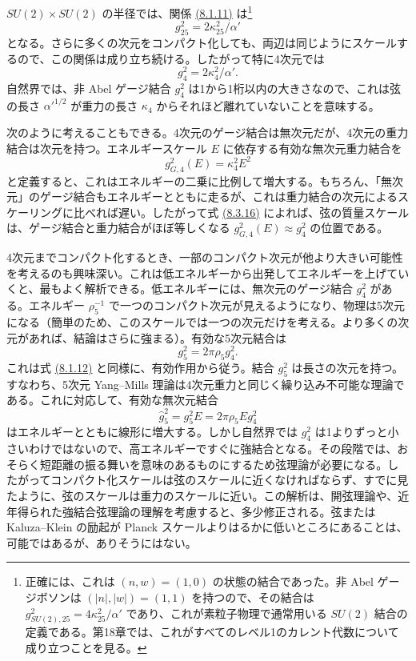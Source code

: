 $SU(2)\times SU(2)$ の半径では、関係 \hyperref[eq:8.1.11]{(8.1.11)} は\footnote[2]{正確には、これは $(n,w)=(1,0)$ の状態の結合であった。非 Abel ゲージボソンは $(|n|,|w|)=(1,1)$ を持つので、その結合は $g_{SU(2),25}^2=4\kappa_{25}^2/\alpha'$ であり、これが素粒子物理で通常用いる $SU(2)$ 結合の定義である。第18章では、これがすべてのレベル1のカレント代数について成り立つことを見る。}
\begin{equation}
g_{25}^2=2\kappa_{25}^2/\alpha'
\tag{8.3.15}\label{eq:8.3.15}
\end{equation}
となる。さらに多くの次元をコンパクト化しても、両辺は同じようにスケールするので、この関係は成り立ち続ける。したがって特に4次元では
\begin{equation}
g_4^2=2\kappa_4^2/\alpha'.
\tag{8.3.16}\label{eq:8.3.16}
\end{equation}
自然界では、非 Abel ゲージ結合 $g_4^2$ は1から1桁以内の大きさなので、これは弦の長さ $\alpha'^{1/2}$ が重力の長さ $\kappa_4$ からそれほど離れていないことを意味する。

次のように考えることもできる。4次元のゲージ結合は無次元だが、4次元の重力結合は次元を持つ。エネルギースケール $E$ に依存する有効な無次元重力結合を
\begin{equation}
g_{G,4}^2(E)=\kappa_4^2E^2
\tag{8.3.17}\label{eq:8.3.17}
\end{equation}
と定義すると、これはエネルギーの二乗に比例して増大する。もちろん、「無次元」のゲージ結合もエネルギーとともに走るが、これは重力結合の次元によるスケーリングに比べれば遅い。したがって式 \hyperref[eq:8.3.16]{(8.3.16)} によれば、弦の質量スケールは、ゲージ結合と重力結合がほぼ等しくなる $g_{G,4}^2(E)\approx g_4^2$ の位置である。

4次元までコンパクト化するとき、一部のコンパクト次元が他より大きい可能性を考えるのも興味深い。これは低エネルギーから出発してエネルギーを上げていくと、最もよく解析できる。低エネルギーには、無次元のゲージ結合 $g_4^2$ がある。エネルギー $\rho_5^{-1}$ で一つのコンパクト次元が見えるようになり、物理は5次元になる（簡単のため、このスケールでは一つの次元だけを考える。より多くの次元があれば、結論はさらに強まる）。有効な5次元結合は
\begin{equation}
g_5^2=2\pi\rho_5g_4^2.
\tag{8.3.18}\label{eq:8.3.18}
\end{equation}
これは式 \hyperref[eq:8.1.12]{(8.1.12)} と同様に、有効作用から従う。結合 $g_5^2$ は長さの次元を持つ。すなわち、5次元 Yang--Mills 理論は4次元重力と同じく繰り込み不可能な理論である。これに対応して、有効な無次元結合
\begin{equation}
\widehat g_5^2=g_5^2E=2\pi\rho_5Eg_4^2
\tag{8.3.19}\label{eq:8.3.19}
\end{equation}
はエネルギーとともに線形に増大する。しかし自然界では $g_4^2$ は1よりずっと小さいわけではないので、高エネルギーですぐに強結合となる。その段階では、おそらく短距離の振る舞いを意味のあるものにするため弦理論が必要になる。したがってコンパクト化スケールは弦のスケールに近くなければならず、すでに見たように、弦のスケールは重力のスケールに近い。この解析は、開弦理論や、近年得られた強結合弦理論の理解を考慮すると、多少修正される。弦または Kaluza--Klein の励起が Planck スケールよりはるかに低いところにあることは、可能ではあるが、ありそうにはない。

